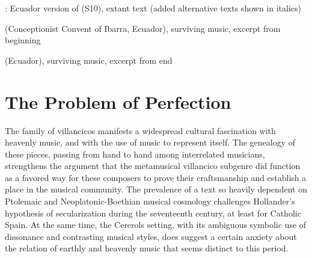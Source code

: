 
{: Ecuador version of 
(S10), extant text (added alternative texts shown in italics)}

{ (Conceptionist Convent of Ibarra, Ecuador),
surviving music, excerpt from beginning}

{ (Ecuador), surviving music, excerpt from end}


\section{The Problem of Perfection}

The family of  villancicos manifests a widespread
cultural fascination with heavenly music, and with the use of music to
represent itself.
The genealogy of these pieces, passing from hand to hand among interrelated
musicians, strengthens the argument that the metamusical villancico subgenre did
function as a favored way for these composers to prove their craftsmanship and
establish a place in the musical community.
The prevalence of a text so heavily dependent on Ptolemaic and
Neoplatonic-Boethian musical cosmology challenges Hollander's hypothesis of
secularization during the seventeenth century, at least for Catholic Spain.
At the same time, the Cererols setting, with its ambiguous symbolic use of
dissonance and contrasting musical styles, does suggest a certain anxiety about
the relation of earthly and heavenly music that seems distinct to this period.


